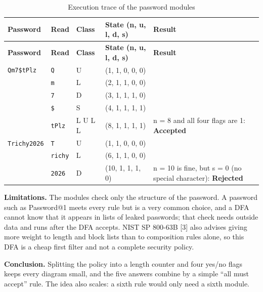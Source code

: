 \documentclass[12pt,a4paper]{article}
\begin{document}
{\footnotesize
\begin{longtable}{|>{\raggedright\arraybackslash}p{}|>{\raggedright\arraybackslash}p{}|>{\centering\arraybackslash}p{}|>{\centering\arraybackslash}p{}|>{\raggedright\arraybackslash}p{}|}
\caption[Execution trace of the password modules]{Execution trace of the password modules}\label{tab:pw_trace}\\
\hline
\rowcolor{hdr}\textbf{Password} & \textbf{Read} & \textbf{Class} & \textbf{State (n, u, l, d, s)} & \textbf{Result}\\ \hline
\endfirsthead
\hline
\rowcolor{hdr}\textbf{Password} & \textbf{Read} & \textbf{Class} & \textbf{State (n, u, l, d, s)} & \textbf{Result}\\ \hline
\endhead
\texttt{Qm7\$tPlz} & \texttt{Q} & U & (1, 1, 0, 0, 0) & \\ \hline
 & \texttt{m} & L & (2, 1, 1, 0, 0) & \\ \hline
 & \texttt{7} & D & (3, 1, 1, 1, 0) & \\ \hline
 & \texttt{\$} & S & (4, 1, 1, 1, 1) & \\ \hline
 & \texttt{tPlz} & L U L L & (8, 1, 1, 1, 1) & n = 8 and all four flags are 1: \textbf{Accepted}\\ \hline
\texttt{Trichy2026} & \texttt{T} & U & (1, 1, 0, 0, 0) & \\ \hline
 & \texttt{richy} & L & (6, 1, 1, 0, 0) & \\ \hline
 & \texttt{2026} & D & (10, 1, 1, 1, 0) & n = 10 is fine, but s = 0 (no special character): \textbf{Rejected}\\ \hline
\end{longtable}}

\textbf{Limitations.} The modules check only the structure of the password. A password such as Password@1 meets every rule but is a very common choice, and a DFA cannot know that it appears in lists of leaked passwords; that check needs outside data and runs after the DFA accepts. NIST SP 800-63B [3] also advises giving more weight to length and block lists than to composition rules alone, so this DFA is a cheap first filter and not a complete security policy.

\textbf{Conclusion.} Splitting the policy into a length counter and four yes/no flags keeps every diagram small, and the five answers combine by a simple ``all must accept'' rule. The idea also scales: a sixth rule would only need a sixth module.
\end{document}
